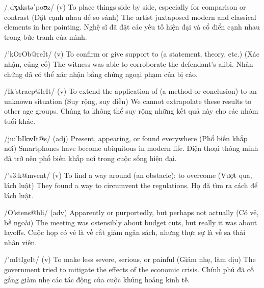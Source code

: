 {/ˌdʒʌkstəˈpoʊz/ (v)}
{To place things side by side, especially for comparison or contrast (Đặt cạnh nhau để so sánh)}
{The artist juxtaposed modern and classical elements in her painting.}
{Nghệ sĩ đã đặt các yếu tố hiện đại và cổ điển cạnh nhau trong bức tranh của mình.}

% 
%

{/'kOrOb@reIt/ (v)}
{To confirm or give support to (a statement, theory, etc.) (Xác nhận, củng cố)}
{The witness was able to corroborate the defendant's alibi.}
{Nhân chứng đã có thể xác nhận bằng chứng ngoại phạm của bị cáo.}

{/Ik'straep@leIt/ (v)}
{To extend the application of (a method or conclusion) to an unknown situation (Suy rộng, suy diễn)}
{We cannot extrapolate these results to other age groups.}
{Chúng ta không thể suy rộng những kết quả này cho các nhóm tuổi khác.}

{/ju:'bIkwIt@s/ (adj)}
{Present, appearing, or found everywhere (Phổ biến khắp nơi)}
{Smartphones have become ubiquitous in modern life.}
{Điện thoại thông minh đã trở nên phổ biến khắp nơi trong cuộc sống hiện đại.}

{/'s3:k@mvent/ (v)}
{To find a way around (an obstacle); to overcome (Vượt qua, lách luật)}
{They found a way to circumvent the regulations.}
{Họ đã tìm ra cách để lách luật.}

{/O'stens@bli/ (adv)}
{Apparently or purportedly, but perhaps not actually (Có vẻ, bề ngoài)}
{The meeting was ostensibly about budget cuts, but really it was about layoffs.}
{Cuộc họp có vẻ là về cắt giảm ngân sách, nhưng thực sự là về sa thải nhân viên.}

{/'mItIgeIt/ (v)}
{To make less severe, serious, or painful (Giảm nhẹ, làm dịu)}
{The government tried to mitigate the effects of the economic crisis.}
{Chính phủ đã cố gắng giảm nhẹ các tác động của cuộc khủng hoảng kinh tế.}

